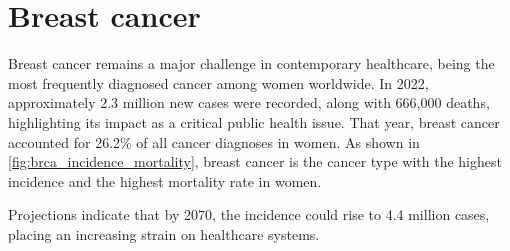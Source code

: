 \section{Breast cancer}
\label{sec:brca}

Breast cancer remains a major challenge in contemporary healthcare, being the
most frequently diagnosed cancer among women worldwide.
In 2022, approximately 2.3 million new cases were recorded, along with 666,000
deaths, highlighting its impact as a critical public health issue.
That year, breast cancer accounted for 26.2\% of all cancer diagnoses in
women\supercite{bray_global_2024,ferlay_global_2024}.
As shown in \cref{fig:brca_incidence_mortality}, breast cancer is the cancer
type with the highest incidence and the highest mortality rate in women.

Projections indicate that by 2070, the incidence could rise to 4.4 million
cases, placing an increasing strain on healthcare
systems\supercite{lei_global_2021}.

